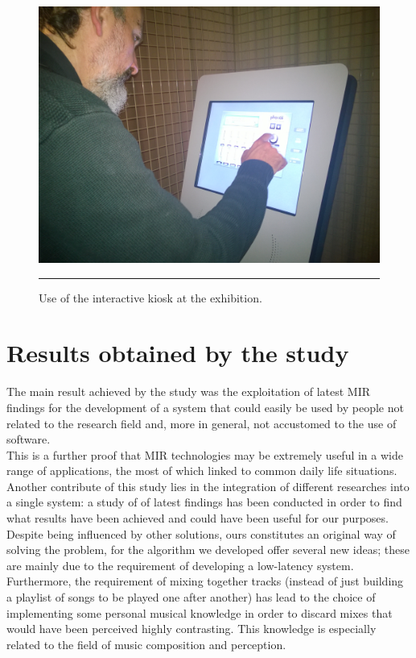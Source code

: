 \begin{figure}[htbp]
\begin{center}
\includegraphics[scale=0.1]{Figures/kiosk2.jpg}
    \rule{20em}{0.5pt}
  \caption[Interactive kiosk at the exhibition]{Use of the interactive kiosk at the exhibition.}
  \label{fig:kiosk}
\end{center}
\end{figure}

\section{Results obtained by the study}
The main result achieved by the study was the exploitation of latest MIR findings for the development of a system that could easily be used by people not related to the research field and, more in general, not accustomed to the use of software. \\
This is a further proof that MIR technologies may be extremely useful in a wide range of applications, the most of which linked to common daily life situations. \\
Another contribute of this study lies in the integration of different researches into a single system: a study of of latest findings has been conducted in order to find what results have been achieved and could have been useful for our purposes. Despite being influenced by other solutions, ours constitutes an original way of solving the problem, for the algorithm we developed offer several new ideas; these are mainly due to the requirement of developing a low-latency system. Furthermore, the requirement of mixing together tracks (instead of just building a playlist of songs to be played one after another) has lead to the choice of implementing some personal musical knowledge in order to discard mixes that would have been perceived highly contrasting. This knowledge is especially related to the field of music composition and perception.\\